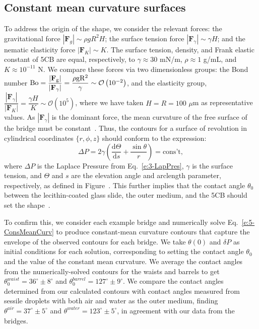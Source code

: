 \subsection{Constant mean curvature surfaces}
To address the origin of the shape, we consider the relevant forces: the gravitational force $|\mathbf{F}_g| \sim \rho g R^2 H$; the surface tension force $|\mathbf{F}_{\gamma}| \sim \gamma H$; and the nematic elasticity force $|\mathbf{F}_K| \sim K$.
The surface tension, density, and Frank elastic constant of 5CB are equal, respectively, to $\gamma \approx 30$ mN/m, $\rho \approx 1$ g/mL, and $K \approx 10^{-11}$ N.
We compare these forces via two dimensionless groups: the Bond number $\rm{Bo} = \dfrac{|\mathbf{F}_g|}{|\mathbf{F}_{\gamma}|} = \dfrac{\rho g R^2}{\gamma} \sim  \mathcal{O}\left (10^{-2} \right)$, and the elasticity group,
 $\dfrac{|\mathbf{F}_{\gamma}|}{|\mathbf{F}_K|} =  \dfrac{\gamma H}{K} \sim \mathcal{O}\left (10^{5} \right )$, where we have taken $H = R = 100$ $\mu$m as representative values.
As $|\mathbf{F}_{\gamma}|$ is the dominant force, the mean curvature of the free surface of the bridge must be constant~\cite{RN178}.
Thus, the contours for a surface of revolution in cylindrical coordinates $\{r,\phi, z\}$ should conform to the expression:
\begin{equation}
  \Delta P = 2 \gamma \left ( \frac{\textrm{d}\Theta}{\textrm{d}s} + \frac{\sin \theta}{r} \right ) = \textrm{cons't},\label{e:5-ConsMeanCurv}
\end{equation}
where $\Delta P$ is the Laplace Pressure from Eq.~\ref{e:3-LapPres}, $\gamma$ is the surface tension, and $\Theta$ and $s$ are the elevation angle and arclength parameter, respectively, as defined in Figure~.
This further implies that the contact angle $\theta_0$ between the lecithin-coated glass slide, the outer medium, and the 5CB should set the shape~\cite{RN178}.

To confirm this, we consider each example bridge and numerically solve Eq.~\ref{e:5-ConsMeanCurv} to produce constant-mean curvature contours that capture the envelope of the observed contours for each bridge.
We take $\theta(0)$ and $\delta P$ as initial conditions for each solution, corresponding to setting the contact angle $\theta_0$ and the value of the constant mean curvature.
We average the contact angles from the numerically-solved contours for the waists and barrels to get $\theta^{waist}_0 = 36^{\circ} \pm 8^{\circ}$ and $\theta^{barrel}_0 = 127^{\circ} \pm 9^{\circ}$.
We compare the contact angles determined from our calculated contours with contact angles measured from sessile droplets with both air and water as the outer medium, finding $\theta^{air} = 37^{\circ} \pm 5^{\circ}$ and $\theta^{water} = 123^{\circ} \pm 5^{\circ}$, in agreement with our data from the bridges.




